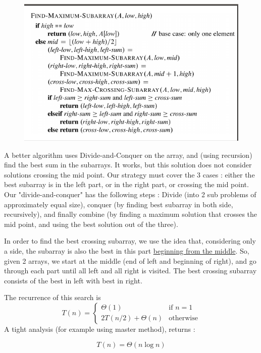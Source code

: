 \documentclass[12pt,twoside,a4paper]{article}
\begin{document}
\begin{figure}
	\includegraphics[scale=0.7]{images/find_max_subarray}
\end{figure}
A better algorithm uses Divide-and-Conquer on the array, and (using recursion) find the best sum in the subarrays. It works, but this solution does not consider solutions crossing the mid point. Our strategy must cover the 3 cases : either the best subarray is in the left part, or in the right part, or crossing the mid point. Our "divide-and-conquer" has the following steps : Divide (into 2 sub problems of approximately equal size), conquer (by finding best subarray in both side, recursively), and finally combine (by finding a maximum solution that crosses the mid point, and using the best solution out of the three).

In order to find the best crossing subarray, we use the idea that, considering only a side, the subarray is also the best in this part \uline{beginning from the middle}. So, given 2 arrays, we start at the middle (end of left and beginning of right), and go through each part until all left and all right is visited. The best crossing subarray consists of the best in left with best in right.		

The recurrence of this search is 
\[T(n) = \left\{\begin{array}{ll}
	\Theta(1) & \text{if } n=1\\
	2T(n/2) + \Theta(n) & \text{otherwise}
\end{array}\right.\]
A tight analysis (for example using master method), returns :
\begin{boite}[0.4]
	\[T(n) = \Theta(n \log n)\]
\end{boite}
\end{document}
